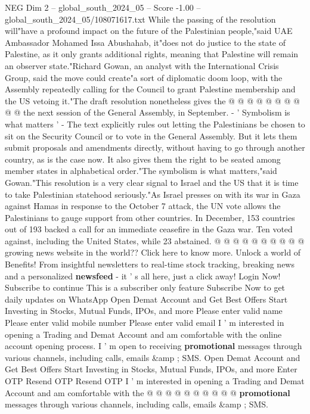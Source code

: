 \begin{textsample}{NEG Dim 2 – global\_south\_2024\_05 – Score -1.00 – global\_south\_2024\_05/108071617.txt}
While the passing of the resolution will"have a profound impact on the future of the Palestinian people,"said UAE Ambassador Mohamed Issa Abushahab, it"does not do justice to the state of Palestine, as it only grants additional rights, meaning that Palestine will remain an observer state."Richard Gowan, an analyst with the International Crisis Group, said the move could create"a sort of diplomatic doom loop, with the Assembly repeatedly calling for the Council to grant Palestine membership and the US vetoing it."The draft resolution nonetheless gives the @ @ @ @ @ @ @ @ @ @ the next session of the General Assembly, in September. - ' Symbolism is what matters ' - The text explicitly rules out letting the Palestinians be chosen to sit on the Security Council or to vote in the General Assembly.
But it lets them submit proposals and amendments directly, without having to go through another country, as is the case now.
It also gives them the right to be seated among member states in alphabetical order."The symbolism is what matters,"said Gowan."This resolution is a very clear signal to Israel and the US that it is time to take Palestinian statehood seriously."As Israel presses on with its war in Gaza against Hamas in response to the October 7 attack, the UN vote allows the Palestinians to gauge support from other countries.
In December, 153 countries out of 193 backed a call for an immediate ceasefire in the Gaza war.
Ten voted against, including the United States, while 23 abstained. @ @ @ @ @ @ @ @ @ @ growing news website in the world??
Click here to know more.
Unlock a world of Benefits!
From insightful newsletters to real-time stock tracking, breaking news and a personalized \textbf{newsfeed} - it ' s all here, just a click away!
Login Now!
Subscribe to continue This is a subscriber only feature Subscribe Now to get daily updates on WhatsApp Open Demat Account and Get Best Offers Start Investing in Stocks, Mutual Funds, IPOs, and more Please enter valid name Please enter valid mobile number Please enter valid email I ' m interested in opening a Trading and Demat Account and am comfortable with the online account opening process.
I ' m open to receiving \textbf{promotional} messages through various channels, including calls, emails \&amp ; SMS.
Open Demat Account and Get Best Offers Start Investing in Stocks, Mutual Funds, IPOs, and more Enter OTP Resend OTP Resend OTP I ' m interested in opening a Trading and Demat Account and am comfortable with the @ @ @ @ @ @ @ @ @ @ \textbf{promotional} messages through various channels, including calls, emails \&amp ; SMS.

\end{textsample}
